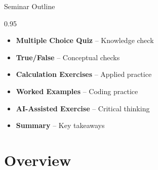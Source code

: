 \documentclass[9pt, aspectratio=169, t]{beamer}
\subtitle{Seminar 1: Stochastic Processes and Stationarity}
\begin{document}
{
\begin{frame}
    \titlepage
\end{frame}
}


\begin{frame}{Seminar Outline}
    \begin{cminipage}{0.95\textwidth}
    \begin{itemize}
        \item \textbf{Multiple Choice Quiz} -- Knowledge check
        \vspace{0.15cm}
        \item \textbf{True/False} -- Conceptual checks
        \vspace{0.15cm}
        \item \textbf{Calculation Exercises} -- Applied practice
        \vspace{0.15cm}
        \item \textbf{Worked Examples} -- Coding practice
        \vspace{0.15cm}
        \item \textbf{AI-Assisted Exercise} -- Critical thinking
        \vspace{0.15cm}
        \item \textbf{Summary} -- Key takeaways
    \end{itemize}
    \end{cminipage}
\end{frame}

\section{Overview}
\end{document}

